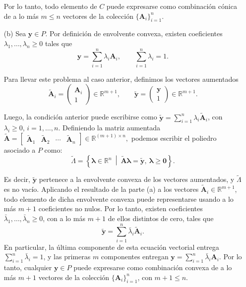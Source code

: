 \begin{enumerate}
Por lo tanto, todo elemento de $C$ puede expresarse como combinación cónica de a lo más $m\leq n$ vectores de la colección $\{\mathbf{A}_i\}_{i=1}^n$.

\item[(b)]
Sea $\mathbf{y} \in P$. Por definición de envolvente convexa, existen coeficientes $\lambda_1,\ldots,\lambda_n \geq 0$ tales que
\begin{equation}
    \mathbf{y}
    =
    \sum_{i=1}^{n} \lambda_i \mathbf{A}_i,
    \qquad
    \sum_{i=1}^{n} \lambda_i = 1.
\end{equation}

Para llevar este problema al caso anterior, definimos los vectores aumentados
\begin{equation}
    \tilde{\mathbf{A}}_i
    =
    \begin{pmatrix}
        \mathbf{A}_i \\
        1
    \end{pmatrix}
    \in \mathbb{R}^{m+1},
    \qquad
    \tilde{\mathbf{y}}
    =
    \begin{pmatrix}
        \mathbf{y} \\
        1
    \end{pmatrix}
    \in \mathbb{R}^{m+1}.
\end{equation}

Luego, la condición anterior puede escribirse como
$\tilde{\mathbf{y}} = \sum_{i=1}^{n} \lambda_i \tilde{\mathbf{A}}_i$,
con $\lambda_i \geq 0$, $i=1,\ldots,n$. Definiendo la matriz aumentada 
$\tilde{\mathbf{A}} =
    \begin{bmatrix}
        \tilde{\mathbf{A}}_1 & \tilde{\mathbf{A}}_2 & \cdots & \tilde{\mathbf{A}}_n
    \end{bmatrix}
    \in \mathbb{R}^{(m+1) \times n},$ podemos escribir el poliedro asociado a $P$ como:
\begin{equation}
\tilde{\Lambda} =
\left\{
 \boldsymbol{\lambda} \in \mathbb{R}^n
\ \middle|\
\tilde{\mathbf{A}}\boldsymbol{\lambda} = \tilde{\mathbf{y}},
 \ \boldsymbol{\lambda} \geq \mathbf{0}
\right\}.
\end{equation}

Es decir, $\tilde{\mathbf{y}}$ pertenece a la envolvente convexa de los vectores aumentados, y $\tilde{\Lambda}$ es no vacío. Aplicando el resultado de la parte (a) a los vectores $\tilde{\mathbf{A}}_i \in \mathbb{R}^{m+1}$, todo elemento de dicha envolvente convexa puede representarse usando a lo más $m+1$ coeficientes no nulos. Por lo tanto, existen coeficientes 
$\bar{\lambda}_1,\ldots,\bar{\lambda}_n \geq 0$, con a lo más $m+1$ de ellos distintos de cero, tales que
\begin{equation}
    \tilde{\mathbf{y}}
    =
    \sum_{i=1}^{n} \bar{\lambda}_i \tilde{\mathbf{A}}_i.
\end{equation}
En particular, la última componente de esta ecuación vectorial entrega $\sum_{i=1}^{n} \bar{\lambda}_i = 1$, y las primeras $m$ componentes entregan $\mathbf{y} = \sum_{i=1}^{n} \bar{\lambda}_i \mathbf{A}_i$. Por lo tanto, cualquier $\mathbf{y} \in P$ puede expresarse como combinación convexa de a lo más $m+1$ vectores de la colección $\{\mathbf{A}_i\}_{i=1}^n$, con $m+1 \leq n$.

\end{enumerate}
